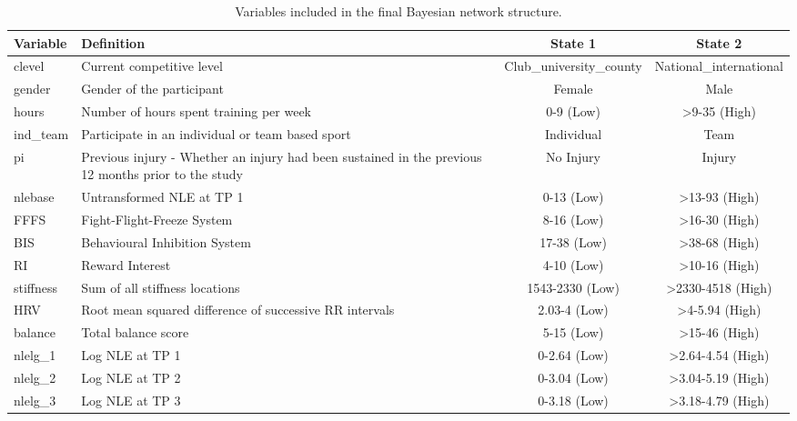 \documentclass[
]{frontiersHLTH}
\begin{document}
\begin{table}[H]

\caption{\label{tab:table3}Variables included in the final Bayesian network structure.}
\centering
\begin{tabular}[t]{l|>{\raggedright\arraybackslash}p{5.2cm}|c|c}
\hline
Variable & Definition & State 1 & State 2\\
\hline
clevel & Current competitive level & Club\_university\_county & National\_international\\
\hline
gender & Gender of the participant & Female & Male\\
\hline
hours & Number of hours spent training per week & 0-9 (Low) & >9-35 (High)\\
\hline
ind\_team & Participate in an individual or team based sport & Individual & Team\\
\hline
pi & Previous injury - Whether an injury had been sustained in the previous 12 months prior to the study & No Injury & Injury\\
\hline
nlebase & Untransformed NLE at TP 1 & 0-13 (Low) & >13-93 (High)\\
\hline
FFFS & Fight-Flight-Freeze System & 8-16 (Low) & >16-30 (High)\\
\hline
BIS & Behavioural Inhibition System & 17-38 (Low) & >38-68 (High)\\
\hline
RI & Reward Interest & 4-10 (Low) & >10-16 (High)\\
\hline
stiffness & Sum of all stiffness locations & 1543-2330 (Low) & >2330-4518 (High)\\
\hline
HRV & Root mean squared difference of successive RR intervals & 2.03-4 (Low) & >4-5.94 (High)\\
\hline
balance & Total balance score & 5-15 (Low) & >15-46 (High)\\
\hline
nlelg\_1 & Log NLE at TP 1 & 0-2.64 (Low) & >2.64-4.54 (High)\\
\hline
nlelg\_2 & Log NLE at TP 2 & 0-3.04 (Low) & >3.04-5.19 (High)\\
\hline
nlelg\_3 & Log NLE at TP 3 & 0-3.18 (Low) & >3.18-4.79 (High)\\
\hline
\end{tabular}
\end{table}
\end{document}
